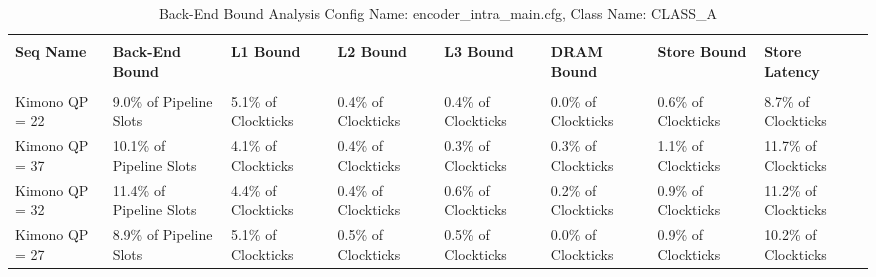 \documentclass{article}%
\begin{document}
\newpage%
\begin{longtabu}{| X[l] | X[l] | X[l] | X[l] | X[l] | X[l] | X[l] | X[l] |}%
\caption{%
Back{-}End Bound Analysis\newline%
 Config Name: encoder\_intra\_main.cfg,\newline%
 Class Name: CLASS\_A\newline%
%
}%
\hline%
&&&&&&&\\%
\textbf{Seq Name}&\textbf{Back{-}End Bound}&\textbf{L1 Bound}&\textbf{L2 Bound}&\textbf{L3 Bound}&\textbf{DRAM Bound}&\textbf{Store Bound}&\textbf{Store Latency}\\%
&&&&&&&\\%
\hline%
\endhead%
Kimono\newline%
 QP = 22&9.0\% of Pipeline Slots&5.1\% of Clockticks&0.4\% of Clockticks&0.4\% of Clockticks&0.0\% of Clockticks&0.6\% of Clockticks&8.7\% of Clockticks\\%
\hline%
Kimono\newline%
 QP = 37&10.1\% of Pipeline Slots&4.1\% of Clockticks&0.4\% of Clockticks&0.3\% of Clockticks&0.3\% of Clockticks&1.1\% of Clockticks&11.7\% of Clockticks\\%
\hline%
Kimono\newline%
 QP = 32&11.4\% of Pipeline Slots&4.4\% of Clockticks&0.4\% of Clockticks&0.6\% of Clockticks&0.2\% of Clockticks&0.9\% of Clockticks&11.2\% of Clockticks\\%
\hline%
Kimono\newline%
 QP = 27&8.9\% of Pipeline Slots&5.1\% of Clockticks&0.5\% of Clockticks&0.5\% of Clockticks&0.0\% of Clockticks&0.9\% of Clockticks&10.2\% of Clockticks\\%
\hline%
\end{longtabu}%
\newpage

%
\end{document}
